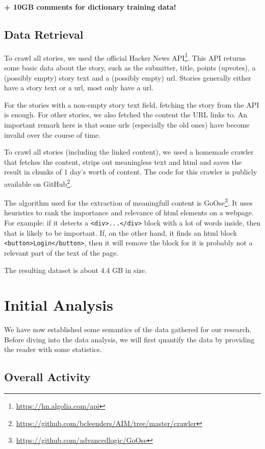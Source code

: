 \textbf{+ 10GB comments for dictionary training data!}

\subsection{Data Retrieval}
To crawl all stories, we used the official Hacker News API\footnote{\url{https://hn.algolia.com/api}}. This API returns some basic data about the story, such as the submitter, title, points (upvotes), a (possibly empty) story text and a (possibly empty) url. Stories generally either have a story text or a url, most only have a url.

For the stories with a non-empty story text field, fetching the story from the API is enough. For other stories, we also fetched the content the URL links to. An important remark here is that some urls (especially the old ones) have become invalid over the course of time.

To crawl all stories (including the linked content), we used a homemade crawler that fetches the content, strips out meaningless text and html and saves the result in chunks of 1 day's worth of content. The code for this crawler is publicly available on GitHub\footnote{\url{https://github.com/bcleenders/AIM/tree/master/crawler}}.

The algorithm used for the extraction of meaningfull content is GoOse\footnote{\url{https://github.com/advancedlogic/GoOse}}. It uses heuristics to rank the importance and relevance of html elements on a webpage. For example: if it detects a \texttt{<div>...</div>} block with a lot of words inside, then that is likely to be important. If, on the other hand, it finds an html block \texttt{<button>Login</button>}, then it will remove the block for it is probably not a relevant part of the text of the page.

The resulting dataset is about 4.4 GB in size.

\section{Initial Analysis}
We have now established some semantics of the data gathered for our research. Before diving into the data analysis, we will first quantify the data by providing the reader with some statistics.

\subsection{Overall Activity}

